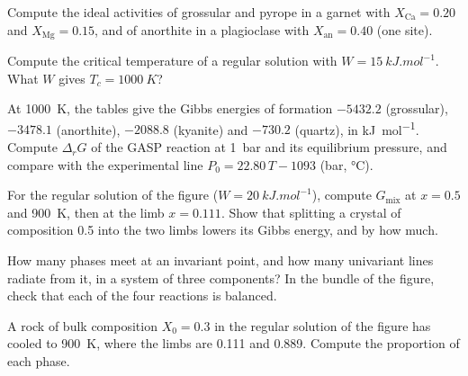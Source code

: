 \begin{exercise}[$\star$]\label{exo:b3:petrological-thermodynamics:3}
Compute the ideal activities of grossular and pyrope in a garnet with
$X_{\text{Ca}} = 0.20$ and $X_{\text{Mg}} = 0.15$, and of anorthite in a
plagioclase with $X_{\text{an}} = 0.40$ (one site).
\end{exercise}

\begin{exercise}[$\star$]\label{exo:b3:petrological-thermodynamics:4}
Compute the critical temperature of a regular solution with $W =
\qty{15}{kJ.mol^{-1}}$. What $W$ gives $T_c = \qty{1000}{K}$?
\end{exercise}

\begin{exercise}[$\star\star$]\label{exo:b3:petrological-thermodynamics:5}
At \qty{1000}{K}, the tables give the Gibbs energies of formation
$-5432.2$ (grossular), $-3478.1$ (anorthite), $-2088.8$ (kyanite) and $-730.2$
(quartz), in \unit{kJ.mol^{-1}}. Compute $\Delta_rG$ of the GASP reaction at
\qty{1}{bar} and its equilibrium pressure, and compare with the experimental
line $P_0 = 22.80\,T - 1093$ (bar, \unit{\celsius}).
\end{exercise}

\begin{exercise}[$\star\star$]\label{exo:b3:petrological-thermodynamics:6}
For the regular solution of the figure ($W = \qty{20}{kJ.mol^{-1}}$), compute
$G_{\text{mix}}$ at $x = 0.5$ and \qty{900}{K}, then at the  limb $x =
0.111$. Show that splitting a crystal of composition 0.5 into the two limbs
lowers its Gibbs energy, and by how much.
\end{exercise}

\begin{exercise}[$\star\star$]\label{exo:b3:petrological-thermodynamics:7}
How many phases meet at an invariant point, and how many univariant lines
radiate from it, in a system of three components? In the bundle of the
figure, check that each of the four reactions is balanced.
\end{exercise}

\begin{exercise}[$\star\star$]\label{exo:b3:petrological-thermodynamics:8}
A rock of bulk composition $X_0 = 0.3$ in the regular solution of the figure
has cooled to \qty{900}{K}, where the  limbs are 0.111 and 0.889.
Compute the proportion of each phase.
\end{exercise}

